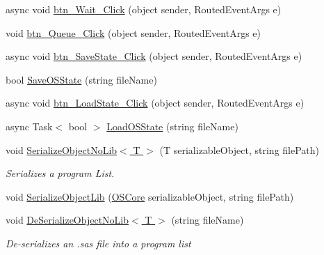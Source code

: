 \begin{DoxyCompactItemize}
\item 
async void \hyperlink{class_c_p_u___o_s___simulator_1_1_operating_system_main_window_a37aa75fec8d0549b2fdecd8923dc5199}{btn\+\_\+\+Wait\+\_\+\+Click} (object sender, Routed\+Event\+Args e)
\item 
void \hyperlink{class_c_p_u___o_s___simulator_1_1_operating_system_main_window_a90ae58b4dddf322bc8255a8ef2c5a840}{btn\+\_\+\+Queue\+\_\+\+Click} (object sender, Routed\+Event\+Args e)
\item 
async void \hyperlink{class_c_p_u___o_s___simulator_1_1_operating_system_main_window_a41de5410a79f29c686ae3c52cb733de1}{btn\+\_\+\+Save\+State\+\_\+\+Click} (object sender, Routed\+Event\+Args e)
\item 
bool \hyperlink{class_c_p_u___o_s___simulator_1_1_operating_system_main_window_aa67e96734f1d4af0d8efc422a60da4a5}{Save\+O\+S\+State} (string file\+Name)
\item 
async void \hyperlink{class_c_p_u___o_s___simulator_1_1_operating_system_main_window_a9cd76943bd0e2b5ad6b7f83ba54bf82e}{btn\+\_\+\+Load\+State\+\_\+\+Click} (object sender, Routed\+Event\+Args e)
\item 
async Task$<$ bool $>$ \hyperlink{class_c_p_u___o_s___simulator_1_1_operating_system_main_window_a82cf10b3c69de54a4eae248f683447c4}{Load\+O\+S\+State} (string file\+Name)
\item 
void \hyperlink{class_c_p_u___o_s___simulator_1_1_operating_system_main_window_aadb99eed63101f954835c42db8a47955}{Serialize\+Object\+No\+Lib$<$ T $>$} (T serializable\+Object, string file\+Path)
\begin{DoxyCompactList}\small\item\em Serializes a program List. \end{DoxyCompactList}\item 
void \hyperlink{class_c_p_u___o_s___simulator_1_1_operating_system_main_window_a066190e07e3b44d3d24da5e4a2122d8c}{Serialize\+Object\+Lib} (\hyperlink{class_c_p_u___o_s___simulator_1_1_operating___system_1_1_o_s_core}{O\+S\+Core} serializable\+Object, string file\+Path)
\item 
void \hyperlink{class_c_p_u___o_s___simulator_1_1_operating_system_main_window_a76308e7789966a2b612b0ff59cc9ac98}{De\+Serialize\+Object\+No\+Lib$<$ T $>$} (string file\+Name)
\begin{DoxyCompactList}\small\item\em De-\/serializes an .sas file into a program list \end{DoxyCompactList}\item 

\end{DoxyCompactItemize}
